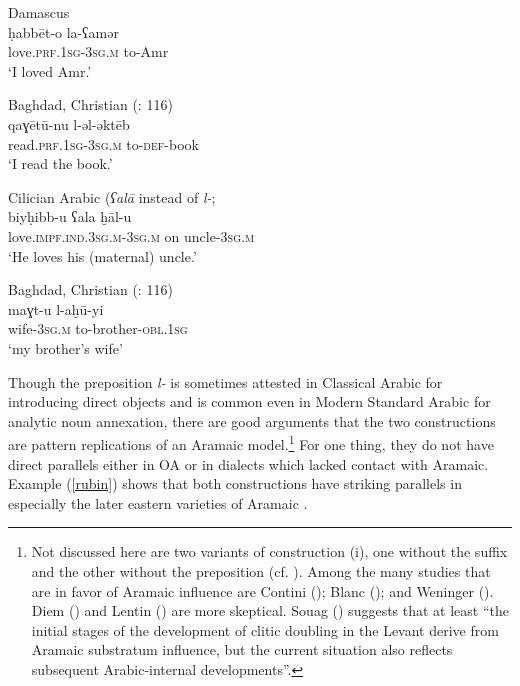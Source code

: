 \documentclass[output=paper]{langsci/langscibook}
\begin{document}
\ea
{Damascus \citep[144]{Berlinches2016}} \\
\gll ḥabbēt-o la-ʕamər\\
     love.\textsc{prf.1sg}-\textsc{3sg.m} to-Amr\\
\glt ‘I loved Amr.’ \label{damas}
\z

\ea 
{Baghdad, Christian (\citealt{Abu-Haidar1991}: 116)}\\
\gll  qaɣētū-nu l-əl-əktēb\\
     read.\textsc{prf.1sg}{}-\textsc{3sg.m} to-\textsc{def}{}-book\\
\glt ‘I read the book.’
\z

\ea 
{Cilician Arabic (\textit{ʕalā} instead of \textit{l-}; \citealt[158]{Procházka2002Cukurova}}\\
\gll   biyḥibb-u ʕala ḫāl-u\\
     love.\textsc{impf.ind.3sg.m}{}-\textsc{3sg.m} on uncle-\textsc{3sg.m}\\
\glt ‘He loves his (maternal) uncle.’ \label{cilic}
\z

\ea 
{Baghdad, Christian (\citealt{Abu-Haidar1991}: 116)} \\
\gll maɣt-u l-aḫū-yi\\
     wife\textsc{-3sg.m} to-brother-\textsc{obl.1sg}\\
\glt ‘my brother’s wife’ \label{christ}
\z

Though the preposition \textit{l-} is sometimes attested in Classical Arabic for introducing direct objects and is common even in Modern Standard Arabic for analytic noun annexation, there are good arguments that the two constructions are pattern replications of an Aramaic model.\footnote{Not discussed here are two variants of construction (i), one without the suffix and the other without the preposition (cf. \citealt[203]{Lentin2018}). Among the many studies that are in favor of Aramaic influence are Contini (\citeyear[105]{Contini1999}); Blanc (\citeyear[130]{Blanc1964}); and Weninger (\citeyear[750]{Weninger2011Aramaic}). Diem (\citeyear[47--49]{Diem1979}) and Lentin (\citeyear{Lentin2018}) are more skeptical. Souag (\citeyear[52]{Souag2017clitic}) suggests that at least “the initial stages of the development of clitic doubling in the Levant derive from Aramaic substratum influence, but the current situation also reflects subsequent Arabic-internal developments”.} For one thing, they do not have direct parallels either in OA or in dialects which lacked contact with Aramaic. Example (\ref{rubin}) shows that both constructions have striking parallels in especially the later eastern varieties of Aramaic \citep[94--104]{Rubin2005}. 
\end{document}
